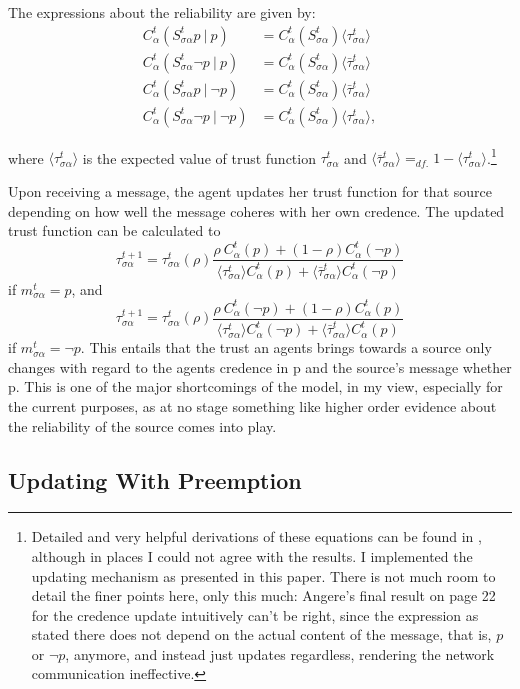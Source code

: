 \documentclass[11pt, a4paper]{article}
\newcommand{\Stsa}{S^t_{\sigma\alpha}}
\newcommand{\sa}{{\sigma\alpha}}
\newcommand{\given}[1][]{\:#1\vert\:}
\renewcommand{\a}{\alpha}
\begin{document}
The expressions about the reliability are given by:
\begin{align*}
    C^t_\a (\Stsa p \given p) &= C^t_\a (\Stsa) \langle \tau^t_{\sa} \rangle \\
    C^t_\a (\Stsa \neg p \given p) &= C^t_\a (\Stsa) \langle \bar{\tau}^t_{\sa} \rangle \\
    C^t_\a (\Stsa p \given \neg p) &= C^t_\a (\Stsa) \langle \bar{\tau}^t_{\sa} \rangle \\
    C^t_\a (\Stsa \neg p \given \neg p) &= C^t_\a (\Stsa) \langle \tau^t_{\sa} \rangle,
\end{align*}

where $\langle \tau^t_{\sa} \rangle $ is the expected value of trust function $ \tau^t_{\sa} $ and ${\langle \bar{\tau}^t_{\sa} \rangle =_{df.} 1 - \langle \tau^t_{\sa} \rangle}$.\footnote{Detailed and very helpful derivations of these equations can be found in \textcite{Angere2010}, although in places I could not agree with the results. I implemented the updating mechanism as presented in this paper. There is not much room to detail the finer points here, only this much: Angere's final result on page 22 for the credence update intuitively can't be right, since the expression as stated there does not depend on the actual content of the message, that is, $p$ or $\neg p$, anymore, and instead just updates regardless, rendering the network communication ineffective.} 

Upon receiving a message, the agent updates her trust function for that source depending on how well the message coheres with her own credence. The updated trust function can be calculated to
\[
    \tau^{t+1}_\sa = \tau^t_\sa (\rho) \frac{\rho \: C^t_\a (p) + (1 - \rho) C^t_\a (\neg p)}
    {\langle \tau^t_\sa \rangle C^t_\a(p) + \langle \bar{\tau}^t_\sa \rangle C^t_\a(\neg p)}
\]
if $m^t_{\sa} = p$, and 
\[
    \tau^{t+1}_\sa = \tau^t_\sa (\rho) \frac{\rho \: C^t_\a (\neg p) + (1 - \rho) C^t_\a (p)}
    {\langle \tau^t_\sa \rangle C^t_\a(\neg p) + \langle \bar{\tau}^t_\sa \rangle C^t_\a(p)}
\]
if $m^t_{\sa} = \neg p$. This entails that the trust an agents brings towards a source only changes with regard to the agents credence in p and the source's message whether p. This is one of the major shortcomings of the model, in my view, especially for the current purposes, as at no stage something like higher order evidence about the reliability of the source comes into play. 

\subsection{Updating With Preemption}
\end{document}
